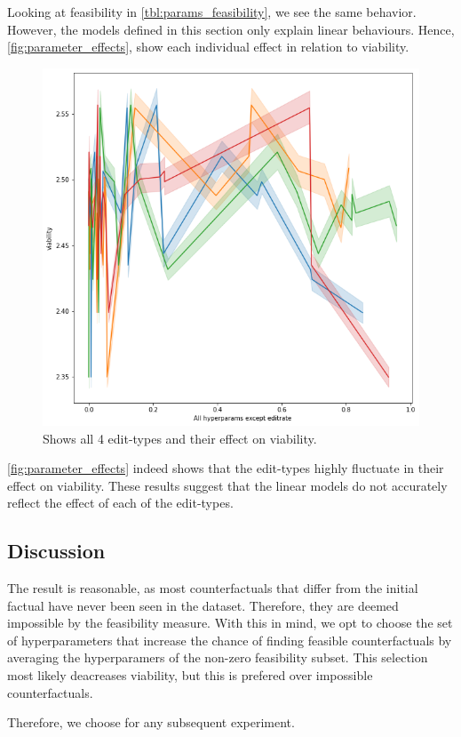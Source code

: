 \documentclass[./../../paper.tex]{subfiles}
\begin{document}

Looking at feasibility in \autoref{tbl:params_feasibility}, we see the same behavior. However, the models defined in this section only explain linear behaviours. Hence, \autoref{fig:parameter_effects}, show each individual effect in relation to viability.

\begin{figure}
    \centering
    \includegraphics[width=\textwidth]{figures/results/result_params.png}
    \caption{Shows all 4 edit-types and their effect on viability.}
    \label{fig:parameter_effects}
\end{figure}

\autoref{fig:parameter_effects} indeed shows that the edit-types highly fluctuate in their effect on viability. These results suggest that the linear models do not accurately reflect the effect of each of the edit-types. 

\subsection{Discussion}
The result is reasonable, as most counterfactuals that differ from the initial factual have never been seen in the dataset. Therefore, they are deemed impossible by the feasibility measure. With this in mind, we opt to choose the set of hyperparameters that increase the chance of finding feasible counterfactuals by averaging the hyperparamers of the non-zero feasibility subset. This selection most likely deacreases viability, but this is prefered over impossible counterfactuals.

Therefore, we choose  for any subsequent experiment.
\end{document}
